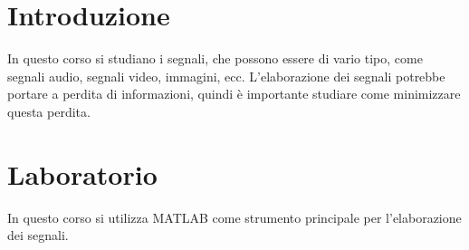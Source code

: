 \documentclass[a4paper]{article}
\begin{document}


\tableofcontents
\pagebreak

\section{Introduzione}
In questo corso si studiano i segnali, che possono essere di vario tipo, come segnali audio,
segnali video, immagini, ecc. L'elaborazione dei segnali potrebbe portare a perdita di
informazioni, quindi è importante studiare come minimizzare questa perdita.

\section{Laboratorio}
In questo corso si utilizza MATLAB come strumento principale per l'elaborazione dei segnali.
\end{document}
